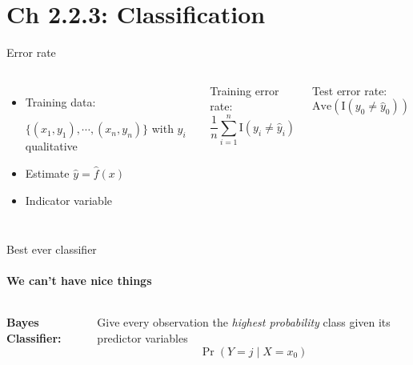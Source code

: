 \documentclass[aspectratio=169,usenames,dvipsnames]{beamer}
\newcommand{\InstructorNotes}[1]{\textit{\color{orange}#1}}
\newcommand{\InstructorList}[1]{
\begin{itemize}
	\color{orange}
	#1
\end{itemize}
}
\renewcommand{\InstructorNotes}[1]{}
\renewcommand{\InstructorList}[1]{}
\begin{document}
\section{Ch 2.2.3: Classification}
\begin{frame}[t]{Error rate}



\begin{columns}
\centering
\begin{itemize}
	\item
Training data:

$\{ (x_1,y_1),\cdots,(x_n,y_n) \}$ with $y_i$ qualitative

\item Estimate $\hat y = \hat f (x)$
\item Indicator variable

\InstructorNotes{$\mathrm{I}(y_i \neq \hat y_i)$ is 1 if not the same (misclassified) and 0 else}
\end{itemize}

Training error rate:
\begin{equation*}
\frac{1}{n} \sum_{i = 1}^n \mathrm{I}(y_i \neq \hat y_i)
\end{equation*}

Test error rate:
\begin{equation*}
	\mathrm{Ave}(\mathrm{I} (y_0 \neq \hat y_0))
\end{equation*}

\InstructorNotes{Good classifier: one that minimizes test error rate}

\end{columns}

\end{frame}


\begin{frame}[c]{Best ever classifier }
	\framesubtitle{We can't have nice things}

\begin{columns}
\textbf{Bayes Classifier:}

Give every observation the \emph{highest probability} class given its predictor variables
\begin{equation*}
	\Pr (Y = j \mid X = x_0)
\end{equation*}
\centering
\InstructorList{
  \item It is possible to show (though the proof is outside of the scope of this
  book) that the test error rate  is minimized, on average, by a
  very simple classifier that assigns each observation to the most likely class,
  given its predictor values.
}

\end{columns}

\end{frame}
\end{document}
